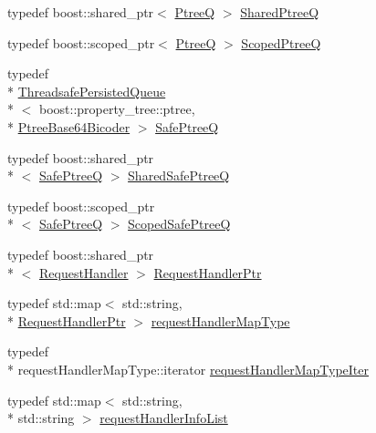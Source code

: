 \begin{DoxyCompactItemize}
\item 
typedef boost\-::shared\-\_\-ptr$<$ \hyperlink{namespacekisscpp_af1d6724570f46ac378171bd45ddf6903}{Ptree\-Q} $>$ \hyperlink{namespacekisscpp_aecf9f29bb4c41e0d4dbc74731a3020cd}{Shared\-Ptree\-Q}
\item 
typedef boost\-::scoped\-\_\-ptr$<$ \hyperlink{namespacekisscpp_af1d6724570f46ac378171bd45ddf6903}{Ptree\-Q} $>$ \hyperlink{namespacekisscpp_a64a7093fe1bdc3f323b469e800eebc7f}{Scoped\-Ptree\-Q}
\item 
typedef \\*
\hyperlink{classkisscpp_1_1_threadsafe_persisted_queue}{Threadsafe\-Persisted\-Queue}\\*
$<$ boost\-::property\-\_\-tree\-::ptree, \\*
\hyperlink{classkisscpp_1_1_ptree_base64_bicoder}{Ptree\-Base64\-Bicoder} $>$ \hyperlink{namespacekisscpp_ac48ab954f4898861f383b80e857e17cc}{Safe\-Ptree\-Q}
\item 
typedef boost\-::shared\-\_\-ptr\\*
$<$ \hyperlink{namespacekisscpp_ac48ab954f4898861f383b80e857e17cc}{Safe\-Ptree\-Q} $>$ \hyperlink{namespacekisscpp_ae95e969e7f5dfd1f36842ac9aa25c7ea}{Shared\-Safe\-Ptree\-Q}
\item 
typedef boost\-::scoped\-\_\-ptr\\*
$<$ \hyperlink{namespacekisscpp_ac48ab954f4898861f383b80e857e17cc}{Safe\-Ptree\-Q} $>$ \hyperlink{namespacekisscpp_a20653e6629a85affc6a1b8529e0a8da0}{Scoped\-Safe\-Ptree\-Q}
\item 
typedef boost\-::shared\-\_\-ptr\\*
$<$ \hyperlink{classkisscpp_1_1_request_handler}{Request\-Handler} $>$ \hyperlink{namespacekisscpp_a21e40edcd4f1a3c7c1cc0015b576c8e5}{Request\-Handler\-Ptr}
\item 
typedef std\-::map$<$ std\-::string, \\*
\hyperlink{namespacekisscpp_a21e40edcd4f1a3c7c1cc0015b576c8e5}{Request\-Handler\-Ptr} $>$ \hyperlink{namespacekisscpp_acaaba8d5ee3dd772dbf008749245c357}{request\-Handler\-Map\-Type}
\item 
typedef \\*
request\-Handler\-Map\-Type\-::iterator \hyperlink{namespacekisscpp_acb02d872f8089cccfccea0cbf2191a76}{request\-Handler\-Map\-Type\-Iter}
\item 
typedef std\-::map$<$ std\-::string, \\*
std\-::string $>$ \hyperlink{namespacekisscpp_a403fe12b3fa48680ec27f8af4286383b}{request\-Handler\-Info\-List}

\end{DoxyCompactItemize}

